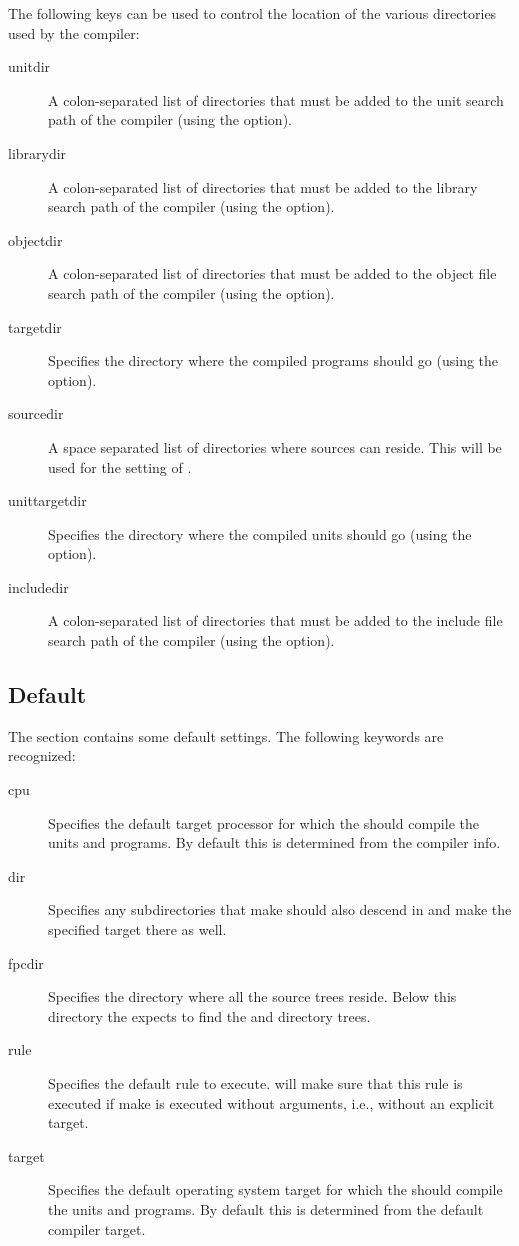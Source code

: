 The following keys can be used to control the location of the various
directories used by the compiler:
\begin{description}
\item[unitdir]
A colon-separated list of directories that must be added to the unit
search path of the compiler (using the  option).
\item[librarydir]
A colon-separated list of directories that must be added to the library
search path of the compiler (using the  option).
\item[objectdir]
A colon-separated list of directories that must be added to the object file
search path of the compiler (using the  option).
\item[targetdir]
Specifies the directory where the compiled programs should go (using the
 option). 
\item[sourcedir]
A space separated list of directories where sources can reside.
This will be used for the  setting of \gnu {}.
\item[unittargetdir]
Specifies the directory where the compiled units should go (using the
 option).
\item[includedir]
A colon-separated list of directories that must be added to the include file
search path of the compiler (using the  option).
\end{description}


\subsection{Default}
The  section contains some default settings. The following keywords
are recognized:
\begin{description}
\item[cpu]
Specifies the default target processor for which the 
should compile the units and programs. By default this is determined from
the compiler info.
\item[dir]
Specifies any subdirectories that make should also descend in and
make the specified target there as well.
\item[fpcdir]
Specifies the directory where all the \fpc source trees reside. Below this
directory the  expects to find the  and
 directory trees.
\item[rule] Specifies the default rule to execute. \fpcmake{}
will make sure that this rule is executed if make is executed without
arguments, i.e., without an explicit target.
\item[target]
Specifies the default operating system target for which the 
should compile the units and programs. By default this is determined from
the default compiler target.
\end{description}


